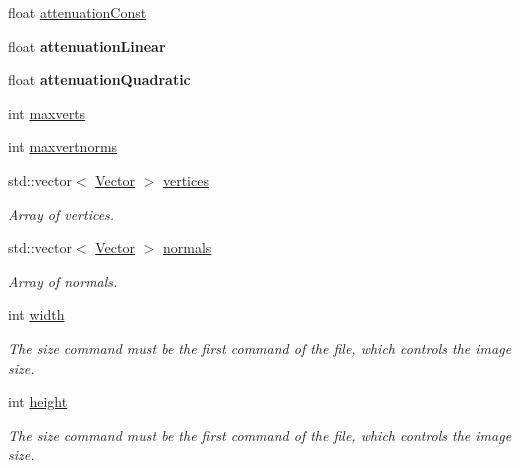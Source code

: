 \begin{DoxyCompactItemize}
float \mbox{\hyperlink{class_scene_a0bb543364c97ad089c167f95e5b06881}{attenuation\+Const}}
\item 
\mbox{\label{class_scene_a3fc3a2641dadd0e6dfc020a4513a5c57}} 
float {\bfseries attenuation\+Linear}
\item 
\mbox{\label{class_scene_afdd9715f1cab3d5560e5cb16a3aabcec}} 
float {\bfseries attenuation\+Quadratic}
\item 
int \mbox{\hyperlink{class_scene_abf5e39ffd2c12b92cb54ce87fb2958cf}{maxverts}}
\item 
int \mbox{\hyperlink{class_scene_ab00585f7f65f5a3c49e4a59432b2083c}{maxvertnorms}}
\item 
\mbox{\label{class_scene_a20f00fc7ba5bce3077f280002fa5626a}} 
std\+::vector$<$ \mbox{\hyperlink{struct_vector}{Vector}} $>$ \mbox{\hyperlink{class_scene_a20f00fc7ba5bce3077f280002fa5626a}{vertices}}
\begin{DoxyCompactList}\small\item\em Array of vertices. \end{DoxyCompactList}\item 
\mbox{\label{class_scene_aaeaa49b74e1f09cb91186e3f8bcf3af8}} 
std\+::vector$<$ \mbox{\hyperlink{struct_vector}{Vector}} $>$ \mbox{\hyperlink{class_scene_aaeaa49b74e1f09cb91186e3f8bcf3af8}{normals}}
\begin{DoxyCompactList}\small\item\em Array of normals. \end{DoxyCompactList}\end{DoxyCompactItemize}
\textbf{ }\par
\begin{DoxyCompactItemize}
\item 
\mbox{\label{class_scene_a99ea310cee6775f4f5bef1940e647cf1}} 
int \mbox{\hyperlink{class_scene_a99ea310cee6775f4f5bef1940e647cf1}{width}}
\begin{DoxyCompactList}\small\item\em The size command must be the first command of the file, which controls the image size. \end{DoxyCompactList}\item 
\mbox{\label{class_scene_a03e1d101ff6c2dbbe8da3ba812cde0f7}} 
int \mbox{\hyperlink{class_scene_a03e1d101ff6c2dbbe8da3ba812cde0f7}{height}}
\begin{DoxyCompactList}\small\item\em The size command must be the first command of the file, which controls the image size. \end{DoxyCompactList}\end{DoxyCompactItemize}

